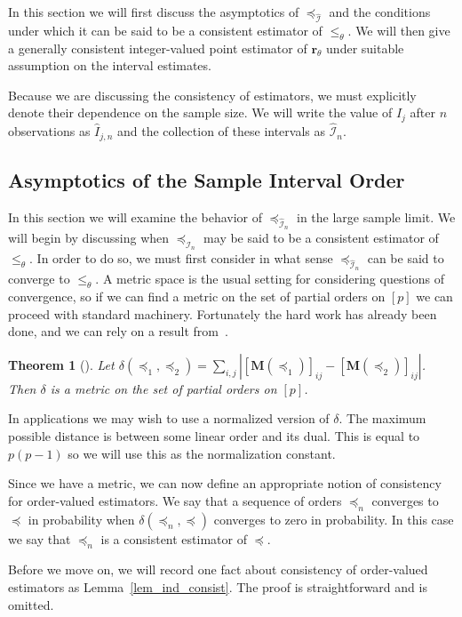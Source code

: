 \documentclass[12pt]{article}
\newcommand{\mat}[1]{\mathbf{M}(#1)}
\newcommand{\iord}{{\preceq_{\hat{\mathcal{I}}}}}
\newcommand{\pord}{{\leqslant_{\theta}}}
\newcommand{\iordn}{{\preceq_{\hat{\mathcal{I}}_{n}}}}
\newcommand{\rankp}{{\mathbf{r}_\theta}}
\newtheorem{theorem}{Theorem}
\numberwithin{theorem}{section}
\begin{document}
In this section we will first discuss the asymptotics of $\iord$ and the conditions under which it can be said to be a consistent estimator of $\pord$.  We will then give a generally consistent integer-valued point estimator of $\rankp$ under suitable assumption on the interval estimates.

Because we are discussing the consistency of estimators, we must explicitly denote their dependence on the sample size.  We will write the value of $\hat{I}_j$ after $n$ observations as $\hat{I}_{j, n}$ and the collection of these intervals as $\hat{\mathcal{I}}_n$.

\subsection{Asymptotics of the Sample Interval Order}
\label{subsec_asymp}

In this section we will examine the behavior of $\iordn$ in the large sample limit.  We will begin by discussing when $\iordn$ may be said to be a consistent estimator of $\pord$.  In order to do so, we must first consider in what sense $\iordn$ can be said to converge to $\pord$.  A metric space is the usual setting for considering questions of convergence, so if we can find a metric on the set of partial orders on $[p]$ we can proceed with standard machinery.  Fortunately the hard work has already been done, and we can rely on a result from~\cite{bogart1973distance}.

\begin{theorem}[\cite{bogart1973distance}]
\label{thm_ord_dist}
Let $\delta(\preceq_1, \preceq_2) = \sum_{i, j}|[\mat{\preceq_1}]_{ij} - [\mat{\preceq_2}]_{ij}|$.  Then $\delta$ is a metric on the set of partial orders on $[p]$.
\end{theorem}

In applications we may wish to use a normalized version of $\delta$.  The maximum possible distance is between some linear order and its dual.  This is equal to $p(p - 1)$ so we will use this as the normalization constant.

Since we have a metric, we can now define an appropriate notion of consistency for order-valued estimators.  We say that a sequence of orders $\preceq_n$ converges to $\preceq$ in probability when $\delta(\preceq_n, \preceq)$ converges to zero in probability.  In this case we say that $\preceq_n$ is a consistent estimator of $\preceq$.

Before we move on, we will record one fact about consistency of order-valued estimators as Lemma~\ref{lem_ind_consist}.  The proof is straightforward and is omitted.
\end{document}
